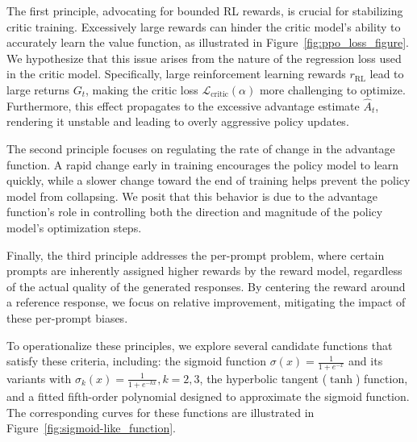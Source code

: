 The first principle, advocating for bounded RL rewards, is crucial for stabilizing critic training. Excessively large rewards can hinder the critic model's ability to accurately learn the value function, as illustrated in Figure~\ref{fig:ppo_loss_figure}. We hypothesize that this issue arises from the nature of the regression loss used in the critic model. Specifically, large reinforcement learning rewards $r_\text{RL}$ lead to large returns \( G_t \), making the critic loss \( \mathcal{L}_\text{critic}(\alpha) \) more challenging to optimize. Furthermore, this effect propagates to the excessive advantage estimate \( \hat{A}_t \), rendering it unstable and leading to overly aggressive policy updates.

The second principle focuses on regulating the rate of change in the advantage function. A rapid change early in training encourages the policy model to learn quickly, while a slower change toward the end of training helps prevent the policy model from collapsing. We posit that this behavior is due to the advantage function's role in controlling both the direction and magnitude of the policy model's optimization steps.

Finally, the third principle addresses the per-prompt problem, where certain prompts are inherently assigned higher rewards by the reward model, regardless of the actual quality of the generated responses. By centering the reward around a reference response, we focus on relative improvement, mitigating the impact of these per-prompt biases.

To operationalize these principles, we explore several candidate functions that satisfy these criteria, including: the sigmoid function $\sigma(x) = \frac{1}{1+e^{-x}}$ and its variants with  \( \sigma_k (x) = \frac{1}{1+e^{-kx}}, k = 2, 3 \), the hyperbolic tangent (\(\tanh\)) function, and a fitted fifth-order polynomial designed to approximate the sigmoid function. The corresponding curves for these functions are illustrated in Figure~\ref{fig:sigmoid-like_function}.

